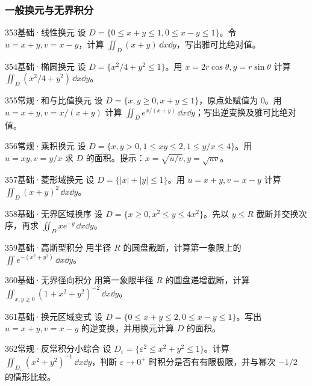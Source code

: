 \subsubsection{一般换元与无界积分}
\begin{exercise}{353}{基础·线性换元}
设 $D=\{0\leq x+y\leq1,0\leq x-y\leq1\}$。令 $u=x+y,v=x-y$，计算 $\iint_D(x+y)\,\dd x\dd y$，写出雅可比绝对值。
\end{exercise}
\begin{exercise}{354}{基础·椭圆换元}
设 $D=\{x^2/4+y^2\leq1\}$。用 $x=2r\cos\theta,y=r\sin\theta$ 计算 $\iint_D(x^2/4+y^2)\,\dd x\dd y$。
\end{exercise}
\begin{exercise}{355}{常规·和与比值换元}
设 $D=\{x,y\geq0,x+y\leq1\}$，原点处赋值为 $0$。用 $u=x+y,v=x/(x+y)$ 计算 $\iint_De^{x/(x+y)}\,\dd x\dd y$；写出逆变换及雅可比绝对值。
\end{exercise}
\begin{exercise}{356}{常规·乘积换元}
设 $D=\{x,y>0,1\leq xy\leq2,1\leq y/x\leq4\}$。用 $u=xy,v=y/x$ 求 $D$ 的面积。提示：$x=\sqrt{u/v},y=\sqrt{uv}$。
\end{exercise}
\begin{exercise}{357}{基础·菱形域换元}
设 $D=\{|x|+|y|\leq1\}$。用 $u=x+y,v=x-y$ 计算 $\iint_D(x+y)^2\,\dd x\dd y$。
\end{exercise}
\begin{exercise}{358}{基础·无界区域换序}
设 $D=\{x\geq0,x^2\leq y\leq4x^2\}$。先以 $y\leq R$ 截断并交换次序，再求 $\iint_Dxe^{-y}\,\dd x\dd y$。
\end{exercise}
\begin{exercise}{359}{基础·高斯型积分}
用半径 $R$ 的圆盘截断，计算第一象限上的 $\iint e^{-(x^2+y^2)}\,\dd x\dd y$。
\end{exercise}
\begin{exercise}{360}{基础·无界径向积分}
用第一象限半径 $R$ 的圆盘递增截断，计算 $\iint_{x,y\geq0}(1+x^2+y^2)^{-2}\,\dd x\dd y$。
\end{exercise}
\begin{exercise}{361}{基础·换元区域变式}
设 $D=\{0\leq x+y\leq2,0\leq x-y\leq1\}$。写出 $u=x+y,v=x-y$ 的逆变换，并用换元计算 $D$ 的面积。
\end{exercise}
\begin{exercise}{362}{常规·反常积分小综合}
设 $D_\varepsilon=\{\varepsilon^2\leq x^2+y^2\leq1\}$。计算 $\iint_{D_\varepsilon}(x^2+y^2)^{-1}\,\dd x\dd y$，判断 $\varepsilon\to0^+$ 时积分是否有有限极限，并与幂次 $-1/2$ 的情形比较。
\end{exercise}
